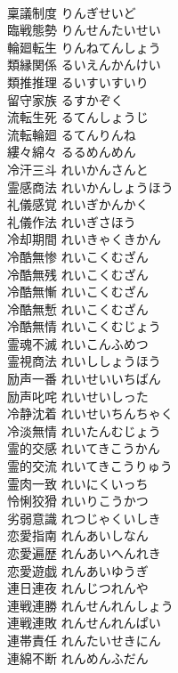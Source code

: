 \documentclass[8pt]{extreport}
\begin{document}
\begin{CJK}{UTF8}{min}
\\	稟議制度	りんぎせいど	
\\	臨戦態勢	りんせんたいせい	
\\	輪廻転生	りんねてんしょう	
\\	類縁関係	るいえんかんけい	
\\	類推推理	るいすいすいり	
\\	留守家族	るすかぞく	
\\	流転生死	るてんしょうじ	
\\	流転輪廻	るてんりんね	
\\	縷々綿々	るるめんめん	
\\	冷汗三斗	れいかんさんと	
\\	霊感商法	れいかんしょうほう	
\\	礼儀感覚	れいぎかんかく	
\\	礼儀作法	れいぎさほう	
\\	冷却期間	れいきゃくきかん	
\\	冷酷無惨	れいこくむざん	
\\	冷酷無残	れいこくむざん	
\\	冷酷無慚	れいこくむざん	
\\	冷酷無慙	れいこくむざん	
\\	冷酷無情	れいこくむじょう	
\\	霊魂不滅	れいこんふめつ	
\\	霊視商法	れいししょうほう	
\\	励声一番	れいせいいちばん	
\\	励声叱咤	れいせいしった	
\\	冷静沈着	れいせいちんちゃく	
\\	冷淡無情	れいたんむじょう	
\\	霊的交感	れいてきこうかん	
\\	霊的交流	れいてきこうりゅう	
\\	霊肉一致	れいにくいっち	
\\	怜悧狡猾	れいりこうかつ	
\\	劣弱意識	れつじゃくいしき	
\\	恋愛指南	れんあいしなん	
\\	恋愛遍歴	れんあいへんれき	
\\	恋愛遊戯	れんあいゆうぎ	
\\	連日連夜	れんじつれんや	
\\	連戦連勝	れんせんれんしょう	
\\	連戦連敗	れんせんれんぱい	
\\	連帯責任	れんたいせきにん	
\\	連綿不断	れんめんふだん	

\end{CJK}
\end{document}
